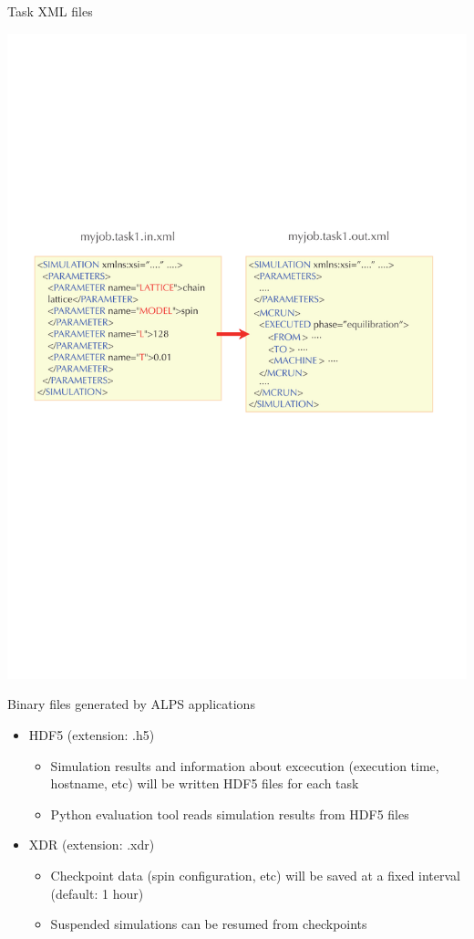 \begin{frame}[t,fragile]{Task XML files}
  \begin{center}
    \includegraphics[height=.6\textheight]{simulation3.pdf}
  \end{center}
\end{frame}

\begin{frame}[t,fragile]{Binary files generated by ALPS applications}
  \begin{itemize}
    \setlength{\itemsep}{1em}
  \item HDF5 (extension: {.h5})
    \begin{itemize}
    \item Simulation results and information about excecution (execution time, hostname, etc) will be written HDF5 files for each task
    \item Python evaluation tool reads simulation results from HDF5 files
    \end{itemize}
  \item XDR (extension: {.xdr})
    \begin{itemize}
    \item Checkpoint data (spin configuration, etc) will be saved at a fixed interval (default: 1 hour)
    \item Suspended simulations can be resumed from checkpoints
    \end{itemize}
  \end{itemize}
\end{frame}

